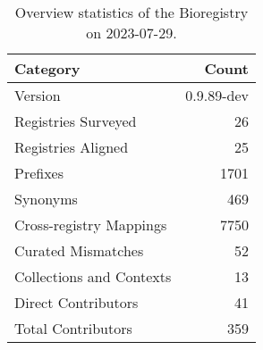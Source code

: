 \begin{table}
\caption{Overview statistics of the Bioregistry on 2023-07-29.}
\label{tab:bioregistry-summary}
\begin{tabular}{lr}
\toprule
Category & Count \\
\midrule
Version & 0.9.89-dev \\
Registries Surveyed & 26 \\
Registries Aligned & 25 \\
Prefixes & 1701 \\
Synonyms & 469 \\
Cross-registry Mappings & 7750 \\
Curated Mismatches & 52 \\
Collections and Contexts & 13 \\
Direct Contributors & 41 \\
Total Contributors & 359 \\
\bottomrule
\end{tabular}
\end{table}
